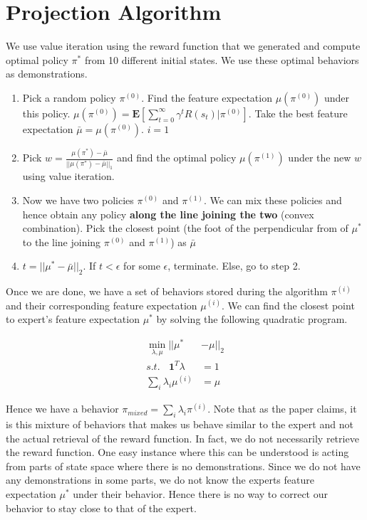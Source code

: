 \documentclass{article}[11pt]
\begin{document}
\section{Projection Algorithm}
We use value iteration using the reward function that we generated and compute optimal policy $\pi^*$ from 10 different initial states. We use these optimal behaviors as demonstrations.
\begin{enumerate}
\item Pick a random policy $\pi^{(0)}$. Find the feature expectation $\mu(\pi^{(0)})$ under this policy. $\mu(\pi^{(0)}) = \textbf{E}[\sum_{t=0}^\infty\gamma^tR(s_t)|\pi^{(0)}]$. Take the best feature expectation $\bar{\mu} = \mu(\pi^{(0)})$. $i=1$
\item Pick {$w = \frac{\mu(\pi^*) - \bar{\mu}}{||\mu(\pi^*) - \bar{\mu}||_1}$} and find the optimal policy $\mu(\pi^{(1)})$ under the new $w$ using value iteration. 
\item Now we have two policies $\pi^{(0)}$ and $\pi^{(1)}$. We can mix these policies and hence obtain any policy \textbf{along the line joining the two} (convex combination). Pick the closest point (the foot of the perpendicular from of $\mu^*$ to the line joining  $\pi^{(0)}$ and $\pi^{(1)}$) as $\bar{\mu}$
\item $t = ||\mu^* - \bar{\mu}||_2$. If $t < \epsilon$ for some $\epsilon$, terminate. Else, go to step 2.

\end{enumerate}

Once we are done, we have a set of behaviors stored during the algorithm $\pi^{(i)}$ and their corresponding feature expectation $\mu^{(i)}$. We can find the closest point to expert's feature expectation $\mu^*$ by solving the following quadratic program.

\begin{align*}
\min_{\lambda,\mu} ||\mu^* &- \mu||_2 \\
s.t. \ \ \ \ \textbf{1}^T\lambda &= 1 \\
\sum_i \lambda_i\mu^{(i)} &= \mu
\end{align*}

Hence we have a behavior $\pi_{mixed} = \sum_i \lambda_i \pi^{(i)}$. Note that as the paper claims, it is this mixture of behaviors that makes us behave similar to the expert and not the actual retrieval of the reward function. In fact, we do not necessarily retrieve the reward function. One easy instance where this can be understood is acting from parts of state space where there is no demonstrations. Since we do not have any demonstrations in some parts, we do not know the experts feature expectation $\mu^*$ under their behavior. Hence there is no way to correct our behavior to stay close to that of the expert. 
\end{document}

